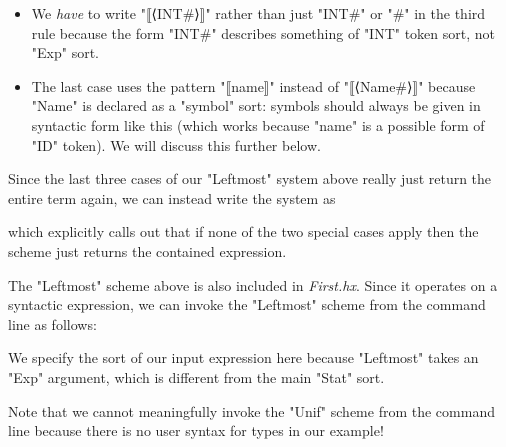 \documentclass[11pt]{article} %
\begin{document}
\begin{example}
\begin{itemize}
  \item We \emph{have} to write "⟦⟨INT#⟩⟧" rather than just "INT#" or "#" in the third rule because
    the form "INT#" describes something of "INT" token sort, not "Exp" sort.

  \item The last case uses the pattern "⟦name⟧" instead of "⟦⟨Name#⟩⟧" because "Name" is declared as
    a "symbol" sort: symbols should always be given in syntactic form like this (which works because
    "name" is a possible form of "ID" token). We will discuss this further below.

  \end{itemize}
\end{example}

\begin{example}
  Since the last three cases of our "Leftmost" system above really just return the entire term
  again, we can instead write the system as
  which explicitly calls out that if none of the two special cases apply then the scheme just
  returns the contained expression.
\end{example}

\begin{commands}
  The "Leftmost" scheme above is also included in \emph{First.hx}.  Since it operates on a syntactic
  expression, we can invoke the "Leftmost" scheme from the command line as follows:
  We specify the sort of our input expression here because "Leftmost" takes an "Exp" argument, which
  is different from the main "Stat" sort.

  Note that we cannot meaningfully invoke the "Unif" scheme from the command line because there is
  no user syntax for types in our example!
\end{commands}
\end{document}

